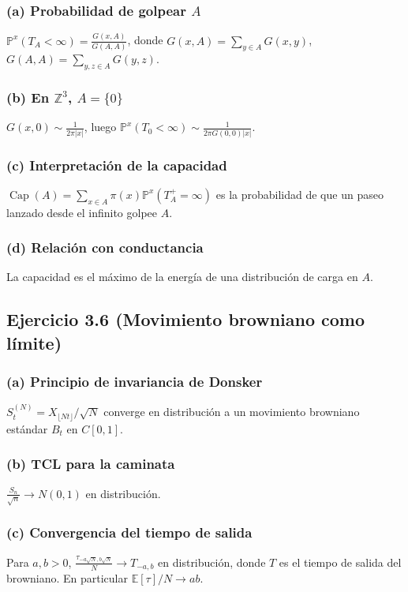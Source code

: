 \documentclass[letterpaper, 12pt]{article}
\newcommand{\E}{\mathbb{E}}
\renewcommand{\P}{\mathbb{P}}
\newcommand{\Z}{\mathbb{Z}}
\newcommand{\1}{\mathbbm{1}}
\begin{document}
    \subsubsection*{(a) Probabilidad de golpear $A$}
    $\P^x(T_A<\infty)=\frac{G(x,A)}{G(A,A)}$, donde $G(x,A)=\sum_{y\in A}G(x,y)$, $G(A,A)=\sum_{y,z\in A}G(y,z)$.

    \subsubsection*{(b) En $\Z^3$, $A=\{0\}$}
    $G(x,0)\sim\frac{1}{2\pi|x|}$, luego $\P^x(T_0<\infty)\sim\frac{1}{2\pi G(0,0)|x|}$.

    \subsubsection*{(c) Interpretaci\'on de la capacidad}
    $\operatorname{Cap}(A)=\sum_{x\in A}\pi(x)\P^x(T_A^+=\infty)$ es la probabilidad de que un paseo lanzado desde el infinito golpee $A$.

    \subsubsection*{(d) Relaci\'on con conductancia}
    La capacidad es el m\'aximo de la energ\'ia de una distribuci\'on de carga en $A$.

    \subsection{Ejercicio 3.6 (Movimiento browniano como l\'imite)}

    \subsubsection*{(a) Principio de invariancia de Donsker}
    $S_t^{(N)}=X_{\lfloor Nt\rfloor}/\sqrt{N}$ converge en distribuci\'on a un movimiento browniano estándar $B_t$ en $C[0,1]$.

    \subsubsection*{(b) TCL para la caminata}
    $\frac{S_n}{\sqrt{n}}\to N(0,1)$ en distribuci\'on.

    \subsubsection*{(c) Convergencia del tiempo de salida}
    Para $a,b>0$, $\frac{\tau_{-a\sqrt{N},b\sqrt{N}}}{N}\to T_{-a,b}$ en distribuci\'on, donde $T$ es el tiempo de salida del browniano. En particular $\E[\tau]/N\to ab$.
\end{document}

